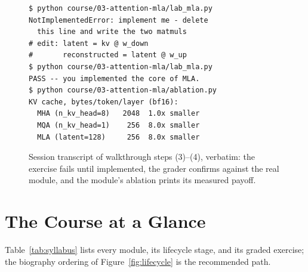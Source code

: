 \begin{figure}[h]
\begin{lstlisting}
$ python course/03-attention-mla/lab_mla.py
NotImplementedError: implement me - delete
  this line and write the two matmuls
# edit: latent = kv @ w_down
#       reconstructed = latent @ w_up
$ python course/03-attention-mla/lab_mla.py
PASS -- you implemented the core of MLA.
$ python course/03-attention-mla/ablation.py
KV cache, bytes/token/layer (bf16):
  MHA (n_kv_head=8)   2048  1.0x smaller
  MQA (n_kv_head=1)    256  8.0x smaller
  MLA (latent=128)     256  8.0x smaller
\end{lstlisting}
\caption{Session transcript of walkthrough steps (3)--(4), verbatim: the
exercise fails until implemented, the grader confirms against the real
module, and the module's ablation prints its measured payoff.}
\label{fig:session}
\end{figure}

\section{The Course at a Glance}
\label{app:syllabus}

Table~\ref{tab:syllabus} lists every module, its lifecycle stage, and its
graded exercise; the biography ordering of Figure~\ref{fig:lifecycle} is the
recommended path.

